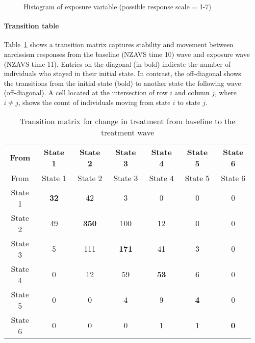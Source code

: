 \documentclass[
  singlecolumn]{article}
\let\oldparagraph\paragraph
\renewcommand{\paragraph}[1]{\oldparagraph{#1}\mbox{}}
\begin{document}
\begin{figure}


\caption{\label{fig-histogram-narcissism}Histogram of exposure variable
(possible response scale = 1-7)}

\end{figure}%

\paragraph{Transition table}\label{transition-table-3}

Table~\ref{tbl-transition-narcissism} shows a transition matrix captures
stability and movement between narcissism responses from the baseline
(NZAVS time 10) wave and exposure wave (NZAVS time 11). Entries on the
diagonal (in bold) indicate the number of individuals who stayed in
their initial state. In contrast, the off-diagonal shows the transitions
from the initial state (bold) to another state the following wave
(off-diagonal). A cell located at the intersection of row \(i\) and
column \(j\), where \(i \neq j\), shows the count of individuals moving
from state \(i\) to state \(j\).

\begin{longtable}[]{@{}ccccccc@{}}
\caption{Transition matrix for change in treatment from baseline to the
treatment wave}\label{tbl-transition-narcissism}\tabularnewline
\toprule\noalign{}
From & State 1 & State 2 & State 3 & State 4 & State 5 & State 6 \\
\midrule\noalign{}
\endfirsthead
\toprule\noalign{}
From & State 1 & State 2 & State 3 & State 4 & State 5 & State 6 \\
\midrule\noalign{}
\endhead
\bottomrule\noalign{}
\endlastfoot
State 1 & \textbf{32} & 42 & 3 & 0 & 0 & 0 \\
State 2 & 49 & \textbf{350} & 100 & 12 & 0 & 0 \\
State 3 & 5 & 111 & \textbf{171} & 41 & 3 & 0 \\
State 4 & 0 & 12 & 59 & \textbf{53} & 6 & 0 \\
State 5 & 0 & 0 & 4 & 9 & \textbf{4} & 0 \\
State 6 & 0 & 0 & 0 & 1 & 1 & \textbf{0} \\
\end{longtable}
\end{document}
